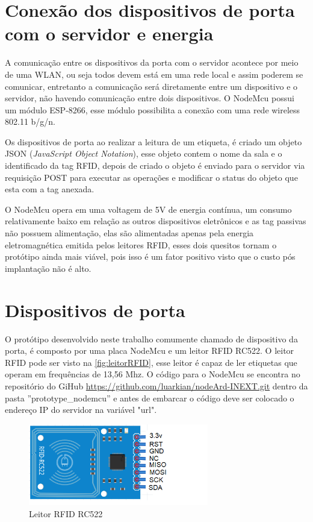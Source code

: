 \section{Conexão dos dispositivos de porta com o servidor e energia}
A comunicação entre os dispositivos da porta com o servidor acontece por meio de uma WLAN, ou seja todos devem está em uma rede
local e assim poderem se comunicar, entretanto a comunicação será diretamente entre um dispositivo e o servidor,
não havendo comunicação entre dois dispositivos. O NodeMcu possui um módulo ESP-8266, esse módulo possibilita a
conexão com uma rede wireless 802.11 b/g/n.
\par
Os dispositivos de porta ao realizar a leitura de um etiqueta, é criado um objeto JSON (\textit{JavaScript Object Notation}), esse objeto contem o nome da sala e o identificado da tag RFID, depois de criado o objeto é enviado para o servidor via requisição POST para executar as operações e modificar o status do objeto que esta com a tag anexada.
\par
O NodeMcu opera em uma voltagem de 5V de energia contínua, um consumo relativamente baixo em relação as outros dispositivos eletrônicos e as tag passivas não possuem alimentação, elas são alimentadas apenas pela energia eletromagnética emitida pelos leitores RFID, esses dois quesitos tornam o protótipo ainda mais viável, pois isso é um fator positivo visto que o custo pós implantação não é alto.


\section{Dispositivos de porta}

O protótipo desenvolvido neste trabalho comumente chamado de dispositivo da porta, é composto por uma placa NodeMcu e um leitor RFID RC522.
O leitor RFID pode ser visto na \autoref{fig:leitorRFID}, esse leitor é capaz de ler etiquetas que operam em
frequências de 13,56 Mhz. O código para o NodeMcu se encontra no repositório do GiHub \url{https://github.com/luarkian/nodeArd-INEXT.git} dentro da pasta ''prototype\_nodemcu'' e antes de embarcar o código deve ser colocado o endereço IP do servidor na variável "url".
\begin{figure}[H]
              \caption{\label{fig:leitorRFID}{Leitor RFID RC522}}
              \centering
              \includegraphics[width=0.7\textwidth]{Figuras/rfid_rc522.PNG}
\end{figure}

